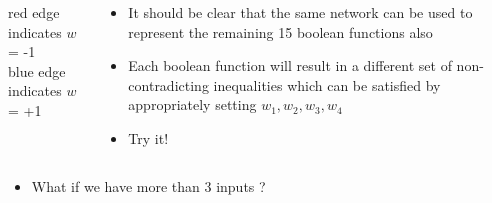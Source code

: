 \documentclass[serif, aspectratio=169]{beamer}
\begin{document}
\begin{frame}
\begin{columns}
\begin{overlayarea}{\textwidth}{\textheight}
			red edge indicates $w$ = -1 \\
			blue edge indicates $w$ = +1


		\end{overlayarea}

		\begin{overlayarea}{\textwidth}{\textheight}

			\begin{itemize}\justifying
				\item<1-> It should be clear that the same network can be used to represent the remaining 15 boolean functions also
				\item<2-> Each boolean function will result in a different set of non-contradicting inequalities which can be satisfied by appropriately setting $w_1, w_2, w_3, w_4$
				\item<3-> Try it!
			\end{itemize}

		\end{overlayarea}
	\end{columns}

\end{frame}

\begin{frame}
	\begin{itemize}\justifying
		\item<1-> What if we have more than 3 inputs ?
	\end{itemize}
\end{frame}
\end{document}
